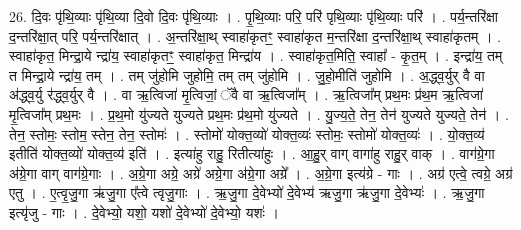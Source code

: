 \documentclass[17pt]{extarticle}
\begin{document}
26. दि॒वः पृ॑थि॒व्याः पृ॑थि॒व्या दि॒वो दि॒वः पृ॑थि॒व्याः । . पृ॒थि॒व्याः परि॒ परि॑ पृथि॒व्याः पृ॑थि॒व्याः परि॑ । . पर्य॒न्तरि॑क्षा द॒न्तरि॑क्षा॒त् परि॒ पर्य॒न्तरि॑क्षात् । . अ॒न्तरि॑क्षा॒थ् स्वाहा॑कृतꣳ॒॒ स्वाहा॑कृत म॒न्तरि॑क्षा द॒न्तरि॑क्षा॒थ् स्वाहा॑कृतम् । . स्वाहा॑कृत॒ मिन्द्रा॒ये न्द्रा॑य॒ स्वाहा॑कृतꣳ॒॒ स्वाहा॑कृत॒ मिन्द्रा॑य । . स्वाहा॑कृत॒मिति॒ स्वाहा᳚ - कृ॒त॒म् । . इन्द्रा॑य॒ तम् त मिन्द्रा॒ये न्द्रा॑य॒ तम् । . तम् जु॑होमि जुहोमि॒ तम् तम् जु॑होमि । . जु॒हो॒मीति॑ जुहोमि । . अ॒द्ध्व॒र्युर् वै वा अ॑द्ध्व॒र्यु र॑द्ध्व॒र्युर् वै । . वा ऋ॒त्विजा॑ मृ॒त्विजां॒ ॅवै वा ऋ॒त्विजा᳚म् । . ऋ॒त्विजा᳚म् प्रथ॒मः प्र॑थ॒म ऋ॒त्विजा॑ मृ॒त्विजा᳚म् प्रथ॒मः । . प्र॒थ॒मो यु॑ज्यते युज्यते प्रथ॒मः प्र॑थ॒मो यु॑ज्यते । . यु॒ज्य॒ते॒ तेन॒ तेन॑ युज्यते युज्यते॒ तेन॑ । . तेन॒ स्तोमः॒ स्तोम॒ स्तेन॒ तेन॒ स्तोमः॑ । . स्तोमो॑ योक्त॒व्यो॑ योक्त॒व्यः॑ स्तोमः॒ स्तोमो॑ योक्त॒व्यः॑ । . यो॒क्त॒व्य॑ इतीति॑ योक्त॒व्यो॑ योक्त॒व्य॑ इति॑ । . इत्या॑हु राहु॒ रितीत्या॑हुः । . आ॒हु॒र् वाग् वागा॑हु राहु॒र् वाक् । . वाग॑ग्रे॒गा अ॑ग्रे॒गा वाग् वाग॑ग्रे॒गाः । . अ॒ग्रे॒गा अग्रे॒ अग्रे॑ अग्रे॒गा अ॑ग्रे॒गा अग्रे᳚ । . अ॒ग्रे॒गा इत्य॑ग्रे - गाः । . अग्र॑ एत्वे॒ त्वग्रे॒ अग्र॑ एतु । . ए॒त्वृ॒जु॒गा ऋ॑जु॒गा ए᳚त्वे त्वृजु॒गाः । . ऋ॒जु॒गा दे॒वेभ्यो॑ दे॒वेभ्य॑ ऋजु॒गा ऋ॑जु॒गा दे॒वेभ्यः॑ । . ऋ॒जु॒गा इत्यृ॑जु - गाः । . दे॒वेभ्यो॒ यशो॒ यशो॑ दे॒वेभ्यो॑ दे॒वेभ्यो॒ यशः॑ । \newline
\end{document}
